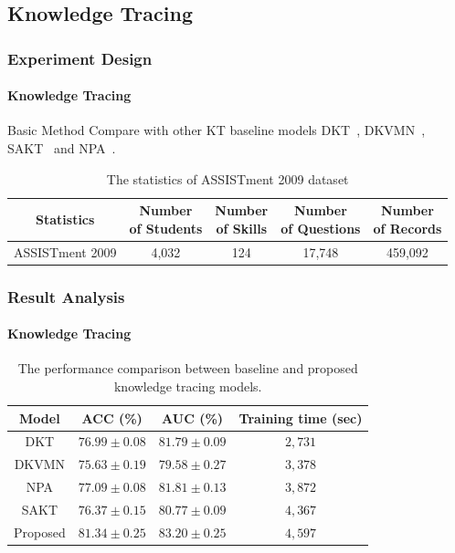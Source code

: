 \documentclass[10pt,aspectratio=43,mathserif]{beamer}
\begin{document}
\subsection{Knowledge Tracing}
\begin{frame}
	\frametitle{Experiment Design}
	\framesubtitle{Knowledge Tracing}
	\begin{block}{Basic Method}
		Compare with other KT baseline models DKT~\cite{piech2015deep}, DKVMN~\cite{chen2017improving}, SAKT~\cite{sakt2019} and NPA~\cite{Lee2019CreatingAN}.
	\end{block}
	\begin{table}
		\centering
		\caption{The statistics of ASSISTment 2009 dataset}\label{tbl:ch3-assist2009-stat}
		\begin{tabular}{ccccc}
			\toprule
			Statistics      & \makecell[c]{Number                          \\ of Students} & \makecell[c]{Number                         \\of Skills }& \makecell[c]{Number                         \\of Questions }& \makecell[c]{Number                         \\ of Records} \\
			\midrule
			ASSISTment 2009 & 4,032               & 124 & 17,748 & 459,092 \\
			\bottomrule
		\end{tabular}
	\end{table}
\end{frame}


\begin{frame}
	\frametitle{Result Analysis}
	\framesubtitle{Knowledge Tracing}
	\begin{table}[htb]
		\centering
		\caption{The performance comparison between baseline and proposed knowledge tracing models.}\label{tbl:ch3-performance}
		\begin{tabular}{cccc}
			\toprule
			Model    & ACC (\%)                    & AUC (\%)                   & Training time (sec) \\
			\midrule
			DKT      & \(76.99\pm 0.08 \)          & \(81.79\pm 0.09\)          & \(2,731\)           \\
			DKVMN    & \(75.63\pm 0.19 \)          & \(79.58\pm 0.27\)          & \(3,378\)           \\
			NPA      & \(77.09\pm 0.08\)           & \(81.81\pm 0.13\)          & \(3,872\)           \\
			SAKT     & \(76.37\pm 0.15\)           & \(80.77\pm 0.09\)          & \(4,367\)           \\
			\midrule
			Proposed & \(\mathbf{81.34\pm 0.25} \) & \(\mathbf{83.20\pm 0.25}\) & \(4,597\)           \\
			\bottomrule
		\end{tabular}
	\end{table}
\end{frame}
\end{document}
